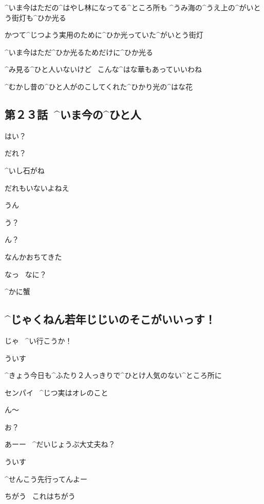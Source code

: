 \Sensei ^{いま}{今}はただの^{はやし}{林}になってる^{ところ}{所}も
^{うみ}{海}の^{うえ}{上}の^{がいとう}{街灯}も^{ひか}{光}る

\Sensei かつて^{じつよう}{実用}のために^{ひか}{光}っていた^{がいとう}{街灯}

\page[114]
\Sensei ^{いま}{今}はただ^{ひか}{光}るためだけに^{ひか}{光}る

\Sensei ^{み}{見}る^{ひと}{人}いないけど
\ こんな^{はな}{華}もあっていいわね

\page[116]
\Sensei ^{むかし}{昔}の^{ひと}{人}がのこしてくれた^{ひかり}{光}の^{はな}{花}


\subsection{第２３話\ ^{いま}{今}の^{ひと}{人}}

\page[130]
\Alpha はい？

\Takahiro だれ？

\Alpha ^{いし}{石}がね

\Alpha だれもいないよねえ

\Takahiro うん

\page[131]
\Takahiro う？

\Alpha ん？

\Takahiro なんかおちてきた

\Alpha なっ
\ なに？

\Takahiro ^{かに}{蟹}


\subsection{^{じゃくねん}{若年}じじいのそこがいいっす！}

\Sensei じゃ
\ ^{い}{行}こうか！

\Ojisan ういす

\Ojisan ^{きょう}{今日}も^{ふたり}{２人}っきりで^{ひとけ}{人気}のない^{ところ}{所}に

\Ojisan センパイ
\ ^{じつ}{実}はオレのこと

\Ojisan ん〜

\Ojisan お？

\Sensei あーー
\ ^{だいじょうぶ}{大丈夫}ね？

\Ojisan ういす

\Sensei ^{せんこう}{先行}ってんよー

\Ojisan ちがう
\ これはちがう
